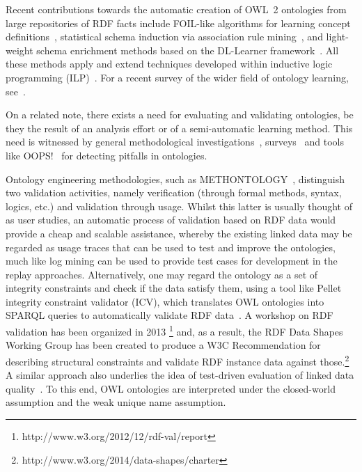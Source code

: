 \documentclass{llncs}
\begin{document}
Recent contributions towards the automatic creation of OWL~2 ontologies
from large repositories of RDF facts include
FOIL-like algorithms for learning concept definitions~\cite{FanizziDAmatoEsposito2008},
statistical schema induction via association rule mining~\cite{FleischhackerVoelkerStuckenschmidt2012},
and light-weight schema enrichment methods based on the DL-Learner
framework~\cite{HellmannLehmannAuer2009,BuehmannLehmann2012}.
All these methods apply and extend techniques developed within inductive logic programming
(ILP)~\cite{ILPat20}. For a recent survey of the wider field of ontology learning,
see~\cite{LehmannVoelker2014}.

On a related note, there exists a need for evaluating and validating ontologies,
be they the result of an analysis effort or of a semi-automatic learning method.
This need is witnessed by general methodological investigations~\cite{GangemiCatenacciCiaramitaLehmann2005,GangemiCatenacciCiaramitaLehmann2006}, 
surveys~\cite{TartirBudakArpinarSheth2007} and tools like OOPS!~\cite{PovedaSuarezGomez2012}
for detecting pitfalls in ontologies.

Ontology engineering methodologies, such as METHONTOLOGY~\cite{FernandezGomezJuristo1997},
distinguish two validation activities, namely verification (through formal methods, syntax, logics, etc.)
and validation through usage. Whilst this latter is usually thought of as user studies,
an automatic process of validation based on RDF data would provide a cheap and scalable assistance,
whereby the existing linked data may be regarded as usage traces that can be used
to test and improve the ontologies, much like log mining can be used to provide
test cases for development in the replay approaches.
Alternatively, one may regard the ontology as a set of integrity constraints and check if the
data satisfy them, using a tool like Pellet integrity constraint validator (ICV),
which translates OWL ontologies into SPARQL queries to automatically validate RDF data~\cite{SirinTao2009}. 
A workshop on RDF validation has been organized in 2013 \footnote{http://www.w3.org/2012/12/rdf-val/report}
and, as a result, the RDF Data Shapes Working Group has been created to produce a W3C Recommendation for describing structural constraints and validate RDF instance data against those.\footnote{http://www.w3.org/2014/data-shapes/charter}
A similar approach also underlies the idea of test-driven evaluation of linked data 
quality~\cite{KontokostasWestphalAuerHellmannLehmannCornelissen2014}.
To this end, OWL ontologies are interpreted under the closed-world assumption and
the weak unique name assumption. 
\end{document}
